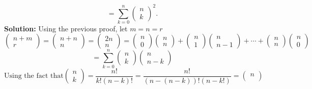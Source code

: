\documentclass{report}
\begin{document}
\begin{enumerate}
\[=\sum_{k=0}^{n}
 \begin{pmatrix}
n \\
k
\end{pmatrix}^2.
\]
{\bf Solution:}
    Using the previous proof, let $m=n=r$ 
    $$
    \begin{pmatrix} 
    n+m \\ r 
    \end{pmatrix} =
    \begin{pmatrix}
    n+n \\ n 
    \end{pmatrix} = 
    \begin{pmatrix}
    2n \\ n 
    \end{pmatrix} =
    \begin{pmatrix}
    n\\ 0
    \end{pmatrix}
    \begin{pmatrix}
    n\\ n
    \end{pmatrix} +
    \begin{pmatrix}
    n\\ 1
    \end{pmatrix}\begin{pmatrix}
    n\\ n-1
    \end{pmatrix}
    +\cdots +
    \begin{pmatrix}
    n\\ n
    \end{pmatrix}\begin{pmatrix}
    n \\ 0
    \end{pmatrix} $$
    $$= \sum_{k=0}^{n}
        \begin{pmatrix}
        n \\
        k
        \end{pmatrix}
        \begin{pmatrix}
        n \\
        n - k
        \end{pmatrix}$$
    $$\text{Using the fact that}
        \begin{pmatrix}
        n \\
        k
        \end{pmatrix}
        = \frac{n!}{k!(n-k)!}
        = \frac{n!}{(n-(n-k))!(n-k!)}
        = \begin{pmatrix}
        n \\

\end{pmatrix}$$
\end{enumerate}
\end{document}
